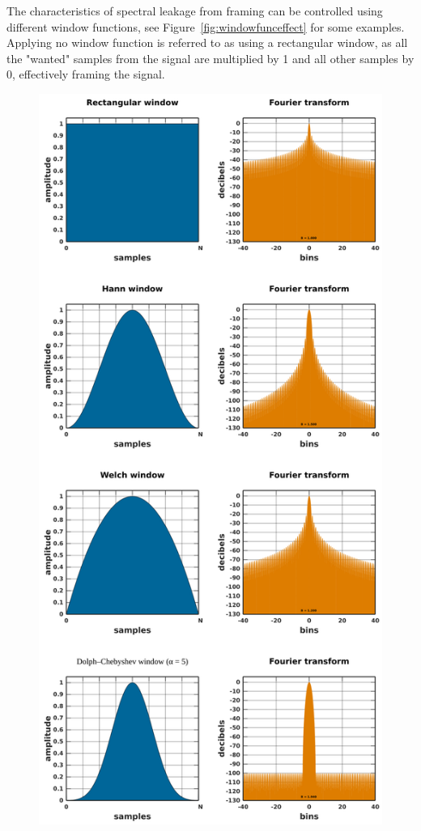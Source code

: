 \documentclass[a4paper,10pt,twocolumn]{article}
\begin{document}
The characteristics of spectral leakage from framing can be controlled using different window functions, see Figure~\ref{fig:windowfunceffect} for some examples. Applying no window function is referred to as using a rectangular window, as all the "wanted" samples from the signal are multiplied by 1 and all other samples by 0, effectively framing the signal.
\begin{figure}[h]
    \centering
    \includegraphics[width=\linewidth]{fig/windows.png}

\end{figure}
\end{document}
